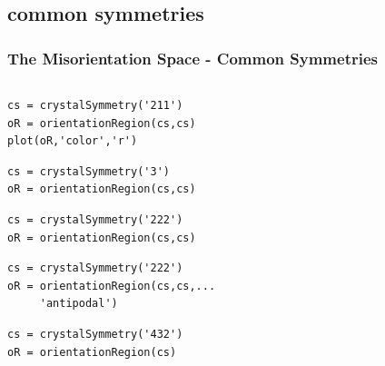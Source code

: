 \documentclass[compress]{beamer}
\begin{document}
\subsection*{common symmetries}

\begin{frame}[fragile]
  \frametitle{The Misorientation Space - Common Symmetries}

  \begin{columns}
    \begin{column}{0.6\textwidth}
      \begin{lstlisting}[style=input]
cs = crystalSymmetry('211')
oR = orientationRegion(cs,cs)
plot(oR,'color','r')
      \end{lstlisting}

      \pause
      \begin{lstlisting}[style=input]
cs = crystalSymmetry('3')
oR = orientationRegion(cs,cs)
\end{lstlisting}

      \pause
      \begin{lstlisting}[style=input]
cs = crystalSymmetry('222')
oR = orientationRegion(cs,cs)
      \end{lstlisting}
      \pause

      \begin{lstlisting}[style=input]
cs = crystalSymmetry('222')
oR = orientationRegion(cs,cs,...
     'antipodal')
      \end{lstlisting}

      \pause
      \begin{lstlisting}[style=input]
cs = crystalSymmetry('432')
oR = orientationRegion(cs)
      \end{lstlisting}



\end{column}
\end{columns}
\end{frame}
\end{document}
